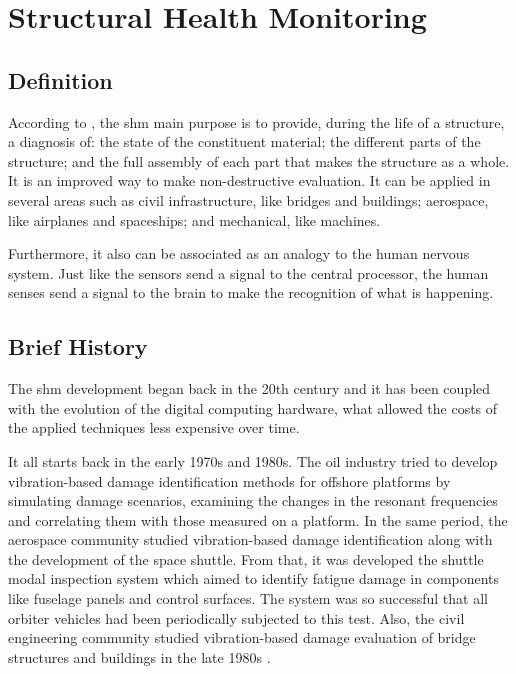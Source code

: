 \section{Structural Health Monitoring}

\subsection{Definition}

According to  \citet{balageas2010}, the \gls*{shm} main purpose is to provide, during the life of a structure,  a diagnosis of: the state of the constituent material; the different parts of the structure; and the full assembly of each part that makes the structure as a whole. 
It is an improved way to make non-destructive evaluation.
It can be applied in several areas such as civil infrastructure, like bridges and buildings; aerospace, like airplanes and spaceships; and mechanical, like machines.


Furthermore, it also can be associated as an analogy to the human nervous system. Just like the sensors send a signal to the central processor, the human 
senses send a signal to the brain to make the recognition of what is happening.

\subsection{Brief History}

The \gls*{shm} development began back in the 20th century and it has been coupled with the evolution of the digital computing hardware, what allowed the costs of the applied techniques less expensive over time.

It all starts back in the early 1970s and 1980s. 
The oil industry tried to develop vibration-based damage identification methods for offshore platforms by simulating damage scenarios, examining the changes in the resonant frequencies and correlating them with those measured on a platform.
In the same period, the aerospace community studied vibration-based damage identification along with the development of the space shuttle. 
From that, it was developed the shuttle modal inspection system which aimed to identify fatigue damage in components like fuselage panels and control surfaces. The system was so successful that all orbiter vehicles had been periodically subjected to this test.
Also, the civil engineering community studied vibration-based damage evaluation of bridge structures and buildings in the late 1980s \citep{farrar2007}.

